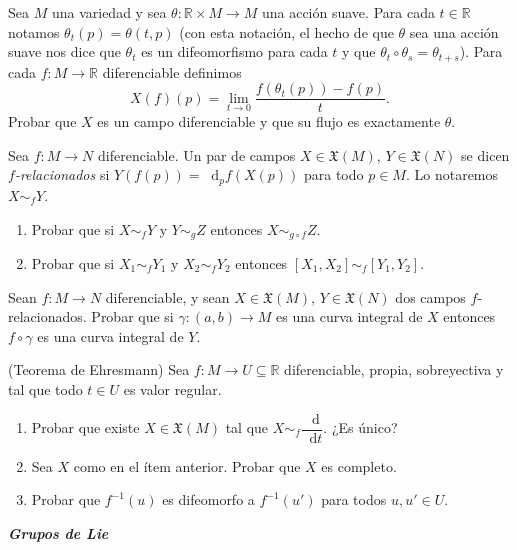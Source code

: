 \documentclass[12pt, a4paper]{amsart}
\theoremstyle{definition}
\newcommand{\RR}{\mathbb{R}}      %
\newcommand*\diff{\mathop{}\!\mathrm{d}}
\begin{document}
\begin{question}
Sea $M$ una variedad y sea $\theta:\RR\times M\to M$ una acción suave. Para cada $t\in\RR$ notamos $\theta_t(p)=\theta(t,p)$ (con esta notación, el hecho de que $\theta$ sea una acción suave nos dice que $\theta_t$ es un difeomorfismo para cada $t$ y que $\theta_t\circ\theta_s=\theta_{t+s}$). Para cada $f:M\to\RR$ diferenciable definimos $$X(f)(p) = \displaystyle\lim_{t\to 0}\frac{f(\theta_t(p))-f(p)}{t}.$$ Probar que $X$ es un campo diferenciable y que su flujo es exactamente $\theta$.
\end{question}

\begin{question}
Sea $f:M\to N$ diferenciable. Un par de campos $X\in\mathfrak{X}(M)$, $Y\in\mathfrak{X}(N)$ se dicen \textit{$f$-relacionados} si $Y(f(p))=\diff_pf(X(p))$ para todo $p\in M$. Lo notaremos $X\sim_f Y$.
\begin{enumerate}[label=\textbf{\alph*.}]
\item Probar que si $X\sim_f Y$ y $Y\sim_g Z$ entonces $X\sim_{g\circ f} Z$.
\item Probar que si $X_1\sim_f Y_1$	 y $X_2\sim_f Y_2$ entonces $[X_1,X_2]\sim_f [Y_1,Y_2]$.
\end{enumerate}
\end{question}

\begin{question}
Sean $f:M\to N$ diferenciable, y sean $X\in\mathfrak{X}(M)$, $Y\in\mathfrak{X}(N)$ dos campos $f$-relacionados. Probar que si $\gamma:(a,b)\to M$ es una curva integral de $X$ entonces $f\circ\gamma$ es una curva integral de $Y$.
\end{question}


\begin{question}
(Teorema de Ehresmann) Sea $f:M\to U\subseteq \RR$ diferenciable, propia, sobreyectiva y tal que todo $t\in U$ es valor regular.
\begin{enumerate}[label=\textbf{\alph*.}]
\item Probar que existe $X\in\mathfrak{X}(M)$ tal que $X\sim_f\dfrac{\diff}{\diff t}$. ¿Es único?
\item Sea $X$ como en el ítem anterior. Probar que $X$ es completo.
\item Probar que $f^{-1}(u)$ es difeomorfo a $f^{-1}(u')$ para todos $u,u'\in U$.
\end{enumerate}
\end{question}

\textsl{\textbf{Grupos de Lie}}
\vspace{1em}
\end{document}
